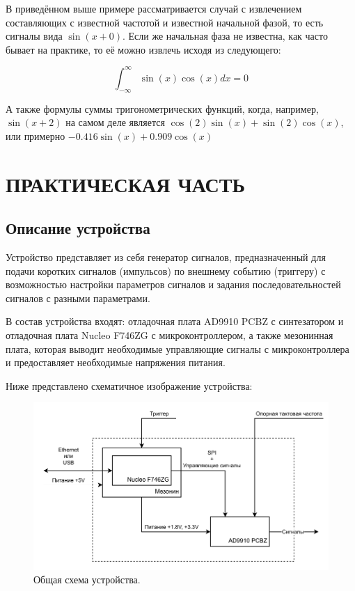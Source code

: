 \documentclass[rusmathsym, eqnumwithinsec, amspack, hyperref]{bomgost}
\begin{document}
В приведённом выше примере рассматривается случай с извлечением составляющих с известной частотой и известной начальной фазой, то есть сигналы вида $\sin(x+0)$. Если же начальная фаза не известна, как часто бывает на практике, то её можно извлечь исходя из следующего:

\begin{equation}
	\int_{-\infty}^{\infty}{\sin(x)\cos(x)}{dx}=0
\end{equation}

А также формулы суммы тригонометрических функций, когда, например, $\sin(x+2)$ на самом деле является $\cos(2)\sin(x) + \sin(2)\cos(x)$, или примерно $-0.416\sin(x) + 0.909\cos(x)$


%
%
\section{ПРАКТИЧЕСКАЯ ЧАСТЬ}
\subsection{Описание устройства}

Устройство представляет из себя генератор сигналов, предназначенный для подачи коротких сигналов (импульсов) по внешнему событию (триггеру) с возможностью настройки параметров сигналов и задания последовательностей сигналов с разными параметрами.

В состав устройства входят: отладочная плата AD9910 PCBZ с синтезатором и отладочная плата Nucleo F746ZG с микроконтроллером, а также мезонинная плата, которая выводит необходимые управляющие сигналы с микроконтроллера и предоставляет необходимые напряжения питания.

Ниже представлено схематичное изображение устройства:

%
%
\begin{gostfigure}
\begin{figure}[H]
\centering
\includegraphics{data/system_architecture.drawio.pdf}
\caption{Общая схема устройства.}
\label{fig:system_architecture}
\end{figure}
\end{gostfigure}
\end{document}
